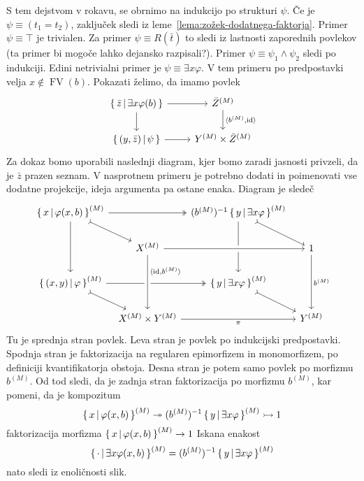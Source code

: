 \documentclass[../kategoricna_logika.tex]{subfiles}
\begin{document}
\begin{dokaz}
  S tem dejstvom v rokavu, se obrnimo na indukcijo po strukturi
  $\psi$.  Če je $\psi \equiv (t_1 = t_2)$, zaključek sledi iz leme~\ref{lema:zožek-dodatnega-faktorja}.
  Primer $\psi \equiv \top$ je
  trivialen.  Za primer $\psi \equiv R(\bar{t})$ to sledi iz lastnosti
  zaporednih povlekov (ta primer bi mogoče lahko dejansko razpisali?).
  Primer $\psi \equiv \psi_1 \land \psi_2$ sledi po indukciji.  Edini
  netrivialni primer je $\psi \equiv \exists x \varphi$.  V
  tem primeru po predpostavki velja $x \notin \operatorname{FV}(b)$.
  Pokazati želimo, da imamo povlek
  \begin{equation*}
    \begin{tikzcd}
      \setb{\bar{z}}{\exists x \varphi(b)} \ar[d] \ar[r] & \interp{\bar{Z}} \ar[d, "\fprod{b^{(M)}, \mathrm{id}}"] \\
      \setb{(y,\bar{z})}{\psi} \ar[r] & Y^{(M)} \times \bar{Z}^{(M)}
    \end{tikzcd}
  \end{equation*}
  Za dokaz bomo uporabili naslednji diagram, kjer bomo zaradi jasnosti
  privzeli, da je $\bar{z}$ prazen seznam.  V nasprotnem primeru je
  potrebno dodati in poimenovati vse dodatne projekcije, ideja
  argumenta pa ostane enaka. Diagram je sledeč
  \begin{equation*}
    \begin{tikzcd}[column sep=tiny]
      \setb{x}{\varphi (x, b)}^{(M)} \ar[dd] \ar[dr, tail] \ar[rr, two heads] & & ( b^{(M)} )^{-1} \setb{y}{\exists x \varphi}^{(M)} \ar[dd] \ar[dr, tail] & \\
      & X^{(M)}  \ar[rr, crossing over] & & 1 \ar[dd, "b^{(M)}"] \\
      \setb{(x,y)}{\varphi}^{(M)} \ar[dr, tail] \ar[rr, two heads] & & \setb{y}{\exists x \varphi}^{(M)} \ar[dr, tail] & \\
      & X^{(M)} \times Y^{(M)} \ar[from=uu, pos=0.3, crossing over,
      "\fprod{\mathrm{id}, b^{(M)}}"] \ar[rr, "\pi"'] & & Y^{(M)}
    \end{tikzcd}
  \end{equation*}
  Tu je sprednja stran povlek. Leva stran je povlek po
  indukcijski predpostavki.  Spodnja stran je faktorizacija na
  regularen epimorfizem in monomorfizem, po definiciji kvantifikatorja
  obstoja.  Desna stran je potem samo povlek po morfizmu $b^{(M)}$.
  Od tod sledi, da je zadnja stran faktorizacija po morfizmu $b^{(M)}$, kar
  pomeni, da je kompozitum
  $$\left\lbrace\, x \,\middle|\, \varphi (x, b) \,\right\rbrace^{(M)} \twoheadrightarrow ( b^{(M)} )^{-1} \left\lbrace\, y \,\middle|\, \exists x \varphi \,\right\rbrace^{(M)} \rightarrowtail 1$$
  faktorizacija morfizma $\left\lbrace\, x \,\middle|\, \varphi (x, b) \,\right\rbrace^{(M)} \to 1$
  Iskana enakost
  $$\left\lbrace\, \cdot \,\middle|\, \exists x \varphi(x,b) \,\right\rbrace^{(M)} = ( b^{(M)} )^{-1} \left\lbrace\, y \,\middle|\, \exists x \varphi \,\right\rbrace^{(M)}$$
  nato sledi iz enoličnosti slik.
\end{dokaz}
\end{document}
